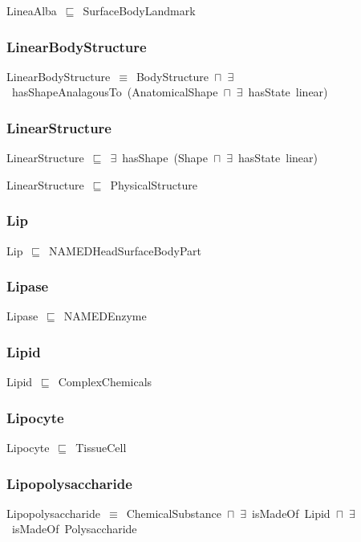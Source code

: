 \documentclass{article}
\begin{document}
LineaAlba~\ensuremath{\sqsubseteq}~SurfaceBodyLandmark~

\subsubsection*{LinearBodyStructure}

LinearBodyStructure~\ensuremath{\equiv}~BodyStructure~\ensuremath{\sqcap}~\ensuremath{\exists}~hasShapeAnalagousTo~(AnatomicalShape~\ensuremath{\sqcap}~\ensuremath{\exists}~hasState~linear)

\subsubsection*{LinearStructure}

LinearStructure~\ensuremath{\sqsubseteq}~\ensuremath{\exists}~hasShape~(Shape~\ensuremath{\sqcap}~\ensuremath{\exists}~hasState~linear)~

LinearStructure~\ensuremath{\sqsubseteq}~PhysicalStructure~

\subsubsection*{Lip}

Lip~\ensuremath{\sqsubseteq}~NAMEDHeadSurfaceBodyPart~

\subsubsection*{Lipase}

Lipase~\ensuremath{\sqsubseteq}~NAMEDEnzyme~

\subsubsection*{Lipid}

Lipid~\ensuremath{\sqsubseteq}~ComplexChemicals~

\subsubsection*{Lipocyte}

Lipocyte~\ensuremath{\sqsubseteq}~TissueCell~

\subsubsection*{Lipopolysaccharide}

Lipopolysaccharide~\ensuremath{\equiv}~ChemicalSubstance~\ensuremath{\sqcap}~\ensuremath{\exists}~isMadeOf~Lipid~\ensuremath{\sqcap}~\ensuremath{\exists}~isMadeOf~Polysaccharide
\end{document}
